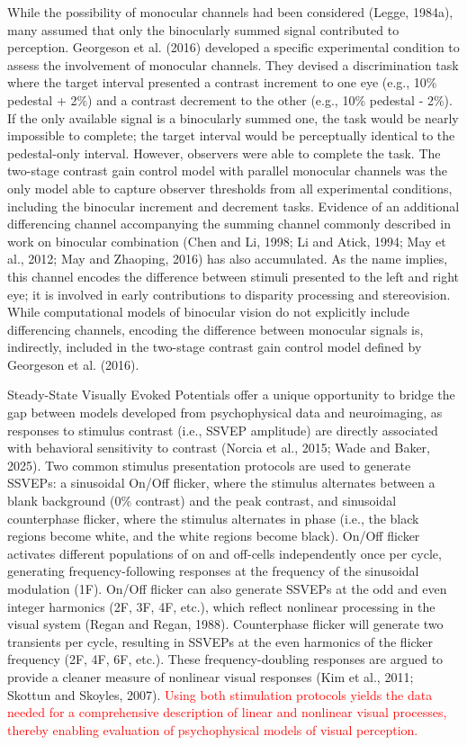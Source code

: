 \documentclass[
  12pt,
]{article}
\begin{document}
While the possibility of monocular channels had been considered (Legge,
1984a), many assumed that only the binocularly summed signal contributed
to perception. Georgeson et al. (2016) developed a specific experimental
condition to assess the involvement of monocular channels. They devised
a discrimination task where the target interval presented a contrast
increment to one eye (e.g., 10\% pedestal + 2\%) and a contrast
decrement to the other (e.g., 10\% pedestal - 2\%). If the only
available signal is a binocularly summed one, the task would be nearly
impossible to complete; the target interval would be perceptually
identical to the pedestal-only interval. However, observers were able to
complete the task. The two-stage contrast gain control model with
parallel monocular channels was the only model able to capture observer
thresholds from all experimental conditions, including the binocular
increment and decrement tasks. Evidence of an additional differencing
channel accompanying the summing channel commonly described in work on
binocular combination (Chen and Li, 1998; Li and Atick, 1994; May et
al., 2012; May and Zhaoping, 2016) has also accumulated. As the name
implies, this channel encodes the difference between stimuli presented
to the left and right eye; it is involved in early contributions to
disparity processing and stereovision. While computational models of
binocular vision do not explicitly include differencing channels,
encoding the difference between monocular signals is, indirectly,
included in the two-stage contrast gain control model defined by
Georgeson et al. (2016).

Steady-State Visually Evoked Potentials offer a unique opportunity to
bridge the gap between models developed from psychophysical data and
neuroimaging, as responses to stimulus contrast (i.e., SSVEP amplitude)
are directly associated with behavioral sensitivity to contrast (Norcia
et al., 2015; Wade and Baker, 2025). Two common stimulus presentation
protocols are used to generate SSVEPs: a sinusoidal On/Off flicker,
where the stimulus alternates between a blank background (0\% contrast)
and the peak contrast, and sinusoidal counterphase flicker, where the
stimulus alternates in phase (i.e., the black regions become white, and
the white regions become black). On/Off flicker activates different
populations of on and off-cells independently once per cycle, generating
frequency-following responses at the frequency of the sinusoidal
modulation (1F). On/Off flicker can also generate SSVEPs at the odd and
even integer harmonics (2F, 3F, 4F, etc.), which reflect nonlinear
processing in the visual system (Regan and Regan, 1988). Counterphase
flicker will generate two transients per cycle, resulting in SSVEPs at
the even harmonics of the flicker frequency (2F, 4F, 6F, etc.). These
frequency-doubling responses are argued to provide a cleaner measure of
nonlinear visual responses (Kim et al., 2011; Skottun and Skoyles,
2007). \textcolor{red}{Using both stimulation protocols yields the data needed
for a comprehensive description of linear and nonlinear visual
processes, thereby enabling evaluation of psychophysical models of
visual perception.}
\end{document}
